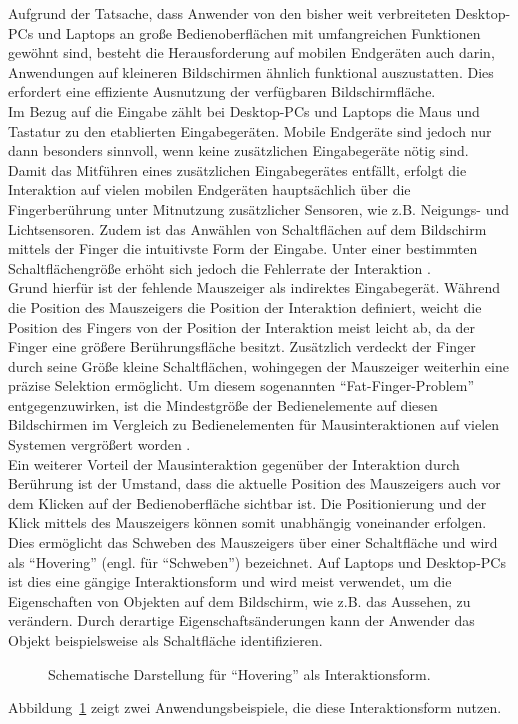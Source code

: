 \documentclass[12pt,numbers=noenddot,parskip,bibliography=totocnumbered,listof=totocnumbered]{scrreprt}
\begin{document}
Aufgrund der Tatsache, dass Anwender von den bisher weit verbreiteten Desktop-PCs und Laptops an große Bedienoberflächen mit umfangreichen Funktionen gewöhnt sind, besteht die Herausforderung auf mobilen Endgeräten auch darin, Anwendungen auf kleineren Bildschirmen ähnlich funktional auszustatten. Dies erfordert eine effiziente Ausnutzung der verfügbaren Bildschirmfläche.\\
Im Bezug auf die Eingabe zählt bei Desktop-PCs und Laptops die Maus und Tastatur zu den etablierten Eingabegeräten. Mobile Endgeräte sind jedoch nur dann besonders sinnvoll, wenn keine zusätzlichen Eingabegeräte nötig sind. Damit das Mitführen eines zusätzlichen Eingabegerätes entfällt, erfolgt die Interaktion auf vielen mobilen Endgeräten hauptsächlich über die Fingerberührung unter Mitnutzung zusätzlicher Sensoren, wie z.B. Neigungs- und Lichtsensoren. Zudem ist das Anwählen von Schaltflächen auf dem Bildschirm mittels der Finger die intuitivste Form der Eingabe. Unter einer bestimmten Schaltflächengröße erhöht sich jedoch die Fehlerrate der Interaktion \citep{mousetouchmk}.\\
Grund hierfür ist der fehlende Mauszeiger als indirektes Eingabegerät. Während die Position des Mauszeigers die Position der Interaktion definiert, weicht die Position des Fingers von der Position der Interaktion meist leicht ab, da der Finger eine größere Berührungsfläche besitzt. Zusätzlich verdeckt der Finger durch seine Größe kleine Schaltflächen, wohingegen der Mauszeiger weiterhin eine präzise Selektion ermöglicht. Um diesem sogenannten "`Fat-Finger-Problem"' \citep{monkeys} entgegenzuwirken, ist die Mindestgröße der Bedienelemente auf diesen Bildschirmen im Vergleich zu Bedienelementen für Mausinteraktionen auf vielen Systemen vergrößert worden \citep{jin}.\\
Ein weiterer Vorteil der Mausinteraktion gegenüber der Interaktion durch Berührung ist der Umstand, dass die aktuelle Position des Mauszeigers auch vor dem Klicken auf der Bedienoberfläche sichtbar ist. Die Positionierung und der Klick mittels des Mauszeigers können somit unabhängig voneinander erfolgen. Dies ermöglicht das Schweben des Mauszeigers über einer Schaltfläche und wird als "`Hovering"' (engl. für "`Schweben"') bezeichnet. Auf Laptops und Desktop-PCs ist dies eine gängige Interaktionsform und wird meist verwendet, um die Eigenschaften von Objekten auf dem Bildschirm, wie z.B. das Aussehen, zu verändern. Durch derartige Eigenschaftsänderungen kann der Anwender das Objekt beispielsweise als Schaltfläche identifizieren.
\begin{figure}
\centering
{}
\hfill
{}
\caption{Schematische Darstellung für "`Hovering"' als Interaktionsform.}
\label{hoveringdesktop}
\end{figure}
Abbildung~\ref{hoveringdesktop} zeigt zwei Anwendungsbeispiele, die diese Interaktionsform nutzen.
\end{document}

